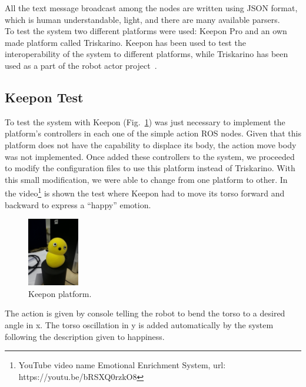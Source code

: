 All the text message broadcast among the nodes are written using JSON format, which is human understandable, light, and there are many available parsers.\\ 
To test the system two different platforms were used: Keepon Pro %
and an own made platform called Triskarino.
Keepon has been used to test the interoperability of the system to different platforms, while Triskarino has been used as a part of the robot actor project~\cite{angel2013}. %
\subsection{Keepon Test}
To test the system with Keepon (Fig.~\ref{fig:keepon}) was just necessary to implement the platform's controllers in each one of the simple action ROS nodes. Given that this platform does not have the capability to displace its body, the action move body was not implemented. Once added these controllers to the system, we proceeded to modify the configuration files to use this platform instead of Triskarino. With this small modification, we were able to change from one platform to other. In the video\footnote{YouTube video name Emotional Enrichment System, url: https://youtu.be/bRSXQ0rzkO8}
is shown the test where Keepon had to move its torso forward and backward to express a ``happy'' emotion. 
\begin{figure}
	\centering
	\includegraphics[width=0.2\textwidth]{./Images/Keepon.jpg}
	\caption{Keepon platform.}
	\label{fig:keepon}
\end{figure} 
The action is given by console telling the robot to bend the torso to a desired angle in x. The torso oscillation in y is added automatically by the system following the description given to happiness. 
